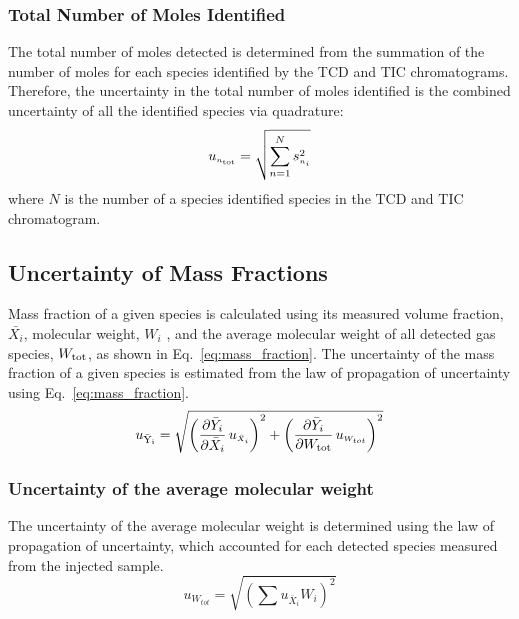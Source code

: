\documentclass[12pt]{article}
\begin{document}
\subsubsection{Total Number of Moles Identified}
\label{ssec:Total Number of Moles Identified}
The total number of moles detected is determined from the summation of the number of moles for each species identified by the TCD and TIC chromatograms. Therefore, the uncertainty in the total number of moles identified is the combined uncertainty of all the identified species via quadrature:
\begin{equation}
\label{eq:totalnumberofmolesdetected}
u_{\scriptscriptstyle n_{\rm tot}}=\sqrt{{\sum_{n=1}^{N} s_{\scriptscriptstyle n_{i}}^2}}
\end{equation}
where $N$ is the number of a species identified species in the TCD and TIC chromatogram.

\subsection{Uncertainty of Mass Fractions}
\label{ssec:Uncertainty of Mass Fractions}

Mass fraction of a given species is calculated using its measured volume fraction, $\bar{X_{i}}$, molecular weight, $W_i$ , and the average molecular weight of all detected gas species, $W_{\rm tot}$, as shown in Eq.~\ref{eq:mass_fraction}. The uncertainty of the mass fraction of a given species is estimated from the law of propagation of uncertainty using Eq.~\ref{eq:mass_fraction}.
\begin{equation}\label{eq:Mass_Frac_Uncertainty}
u_\mathrm{\bar{Y}_{i}} = \sqrt{{\left( \frac{\partial \bar{Y}_{i}}{\partial \bar{X}_{i}}\,u_{\scriptscriptstyle \bar{X}_{i}} \right)}^2+{\left(\frac{\partial \bar{Y}_{i}}{\partial W_{\rm tot}}\,u_{\scriptscriptstyle W_{tot}}\right)}^2}
\end{equation}

\subsubsection{Uncertainty of the average molecular weight}
\label{ssec:Uncertainty of the average molecular weight}

The uncertainty of the average molecular weight is determined using the law of propagation of uncertainty, which accounted for each detected species measured from the injected sample.
\begin{equation}\label{eq:Uncertainty_Total_MW}
	u_{\scriptscriptstyle W_{tot}}=\sqrt{\left(\sum{{u_{\scriptscriptstyle \bar{X}_{i}}}{{W_{i}}}}\right)^2}
\end{equation}
\end{document}
